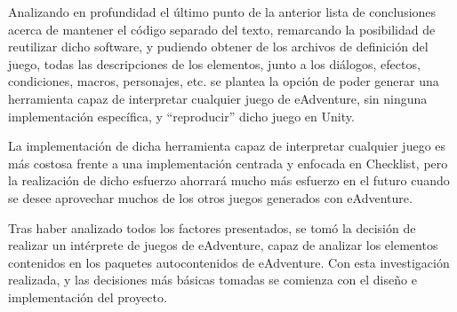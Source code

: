 Analizando en profundidad el último punto de la anterior lista de conclusiones acerca de mantener el código separado del texto, remarcando la posibilidad de reutilizar dicho software, y pudiendo obtener de los archivos de definición del juego, todas las descripciones de los elementos, junto a los diálogos, efectos, condiciones, macros, personajes, etc. se plantea la opción de poder generar una herramienta capaz de interpretar cualquier juego de eAdventure, sin ninguna implementación específica, y “reproducir” dicho juego en Unity. 

La implementación de dicha herramienta capaz de interpretar cualquier juego es más costosa frente a una implementación centrada y enfocada en Checklist, pero la realización de dicho esfuerzo ahorrará mucho más esfuerzo en el futuro cuando se desee aprovechar muchos de los otros juegos generados con eAdventure. 

Tras haber analizado todos los factores presentados, se tomó la decisión de realizar un intérprete de juegos de eAdventure, capaz de analizar los elementos contenidos en los paquetes autocontenidos de eAdventure. Con esta investigación realizada, y las decisiones más básicas tomadas se comienza con el diseño e implementación del proyecto. 

